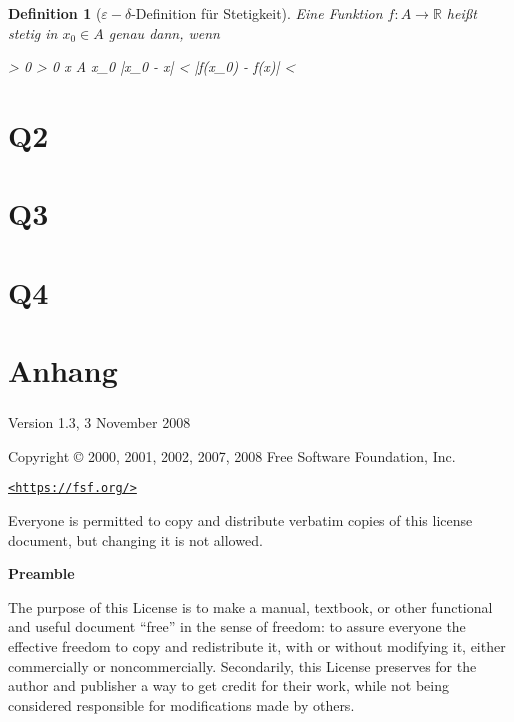 \documentclass{article}
\newtheorem{defn}{Definition}[section]
\newenvironment{aleq*}{\begin{equation*}\begin{aligned}}{\end{aligned}\end{equation*}}
\begin{document}
	\begin{defn}[\(\varepsilon-\delta\)-Definition für Stetigkeit]
		Eine Funktion \(f \colon A \to \mathbb{R}\) heißt stetig in \(x_0 \in A\) genau dann, wenn
		\begin{aleq*}
			\forall \varepsilon > 0 \colon \exists \delta > 0 \colon \forall x \in A \setminus \left\lbrace x_0 \right\rbrace \colon |x_0 - x| < \delta \implies |f(x_0) - f(x)| < \varepsilon {}
		\end{aleq*}
	\end{defn}
	
	\newpage
	\part{Q2}
	\part{Q3}
	\part{Q4}
	
	\part{Anhang}
	\section{}
	\label{sec:fdl}
	
	\begin{center}
		
		Version 1.3, 3 November 2008
		
		
		Copyright \copyright{} 2000, 2001, 2002, 2007, 2008  Free Software Foundation, Inc.
		
		\bigskip
		
		\href{https://fsf.org/}{\texttt{<https://fsf.org/>}}
		
		\bigskip
		
		Everyone is permitted to copy and distribute verbatim copies
		of this license document, but changing it is not allowed.
	\end{center}
	
	
	\begin{center}
		{\bf\large Preamble}
	\end{center}
	
	The purpose of this License is to make a manual, textbook, or other
	functional and useful document ``free'' in the sense of freedom: to
	assure everyone the effective freedom to copy and redistribute it,
	with or without modifying it, either commercially or noncommercially.
	Secondarily, this License preserves for the author and publisher a way
	to get credit for their work, while not being considered responsible
	for modifications made by others.
	
\end{document}
